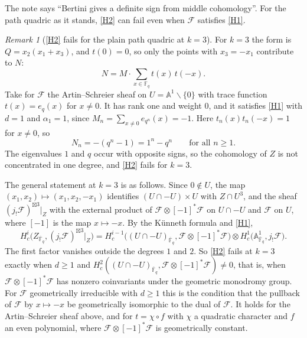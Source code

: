 \documentclass[11pt]{amsbook}
\theoremstyle{plain}
\theoremstyle{definition}
\theoremstyle{remark}
\newtheorem{remark}[theorem]{Remark}
\numberwithin{equation}{section}
\numberwithin{figure}{chapter}
\numberwithin{table}{chapter}
\newcommand{\F}{\mathbb{F}}
\newcommand{\Fb}{\overline{\F}_q}
\newcommand{\cF}{\mathcal{F}}
\begin{document}
The note says ``Bertini gives a definite sign from middle
cohomology''. For the path quadric as it stands, \ref{H2} can fail
even when $\cF$ satisfies \ref{H1}.

\begin{remark}[\ref{H2} fails for the plain path quadric at $k=3$]
\label{rem:h2-fails}
For $k=3$ the form is $Q=x_2(x_1+x_3)$, and $t(0)=0$, so only the
points with $x_3=-x_1$ contribute to $N$:
\[
  N=M\cdot\sum_{x\in\F_q}t(x)\,t(-x).
\]
Take for $\cF$ the Artin--Schreier sheaf on
$U=\mathbb A^1\smallsetminus\{0\}$ with trace function
$t(x)=e_q(x)$ for $x\ne0$. It has rank one and weight $0$, and it
satisfies \ref{H1} with $d=1$ and $\alpha_1=1$, since
$M_n=\sum_{x\ne0}e_{q^n}(x)=-1$. Here $t_n(x)t_n(-x)=1$ for
$x\ne0$, so
\[
  N_n=-(q^n-1)=1^n-q^n\qquad\text{for all }n\ge1.
\]
The eigenvalues $1$ and $q$ occur with opposite signs, so the
cohomology of $Z$ is not concentrated in one degree, and \ref{H2}
fails for $k=3$.

The general statement at $k=3$ is as follows. Since $0\notin U$,
the map $(x_1,x_2)\mapsto(x_1,x_2,-x_1)$ identifies
$(U\cap-U)\times U$ with $Z\cap U^3$, and the sheaf
$(j_!\cF)^{\boxtimes3}|_Z$ with the external product of
$\cF\otimes[-1]^*\cF$ on $U\cap-U$ and $\cF$ on $U$, where $[-1]$
is the map $x\mapsto-x$. By the K\"unneth formula and \ref{H1},
\[
  H^i_c\bigl(Z_{\Fb},(j_!\cF)^{\boxtimes3}|_Z\bigr)
  = H^{i-1}_c\bigl((U\cap-U)_{\Fb},\cF\otimes[-1]^*\cF\bigr)
  \otimes H^1_c\bigl(\mathbb A^1_{\Fb},j_!\cF\bigr).
\]
The first factor vanishes outside the degrees $1$ and $2$. So
\ref{H2} fails at $k=3$ exactly when $d\ge1$ and
$H^2_c((U\cap-U)_{\Fb},\cF\otimes[-1]^*\cF)\ne0$, that is, when
$\cF\otimes[-1]^*\cF$ has nonzero coinvariants under the geometric
monodromy group. For $\cF$ geometrically irreducible with $d\ge1$
this is the condition that the pullback of $\cF$ by $x\mapsto-x$ be
geometrically isomorphic to the dual of $\cF$. It holds for the
Artin--Schreier sheaf above, and for $t=\chi\circ f$ with $\chi$ a
quadratic character and $f$ an even polynomial, where
$\cF\otimes[-1]^*\cF$ is geometrically constant.


\end{remark}
\end{document}
